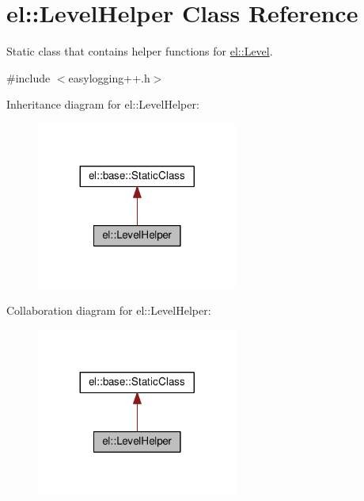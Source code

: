 \hypertarget{classel_1_1_level_helper}{}\section{el\+:\+:Level\+Helper Class Reference}
\label{classel_1_1_level_helper}


Static class that contains helper functions for \hyperlink{namespaceel_ab0ac6091262344c52dd2d3ad099e8e36}{el\+::\+Level}.  




{\ttfamily \#include $<$easylogging++.\+h$>$}



Inheritance diagram for el\+:\+:Level\+Helper\+:
\nopagebreak
\begin{figure}[H]
\begin{center}
\leavevmode
\includegraphics[width=188pt]{classel_1_1_level_helper__inherit__graph}
\end{center}
\end{figure}


Collaboration diagram for el\+:\+:Level\+Helper\+:
\nopagebreak
\begin{figure}[H]
\begin{center}
\leavevmode
\includegraphics[width=188pt]{classel_1_1_level_helper__coll__graph}
\end{center}
\end{figure}
